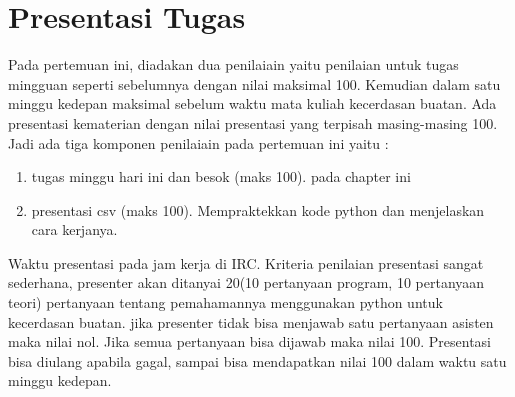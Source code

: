 \section{Presentasi Tugas}
Pada pertemuan ini, diadakan dua penilaiain yaitu penilaian untuk tugas mingguan seperti sebelumnya dengan nilai maksimal 100. Kemudian dalam satu minggu kedepan maksimal sebelum waktu mata kuliah kecerdasan buatan. Ada presentasi kematerian dengan nilai presentasi yang terpisah masing-masing 100. Jadi ada tiga komponen penilaiain pada pertemuan ini yaitu :
\begin{enumerate}
	\item tugas minggu hari ini dan besok (maks 100). pada chapter ini
	\item presentasi csv (maks 100). Mempraktekkan kode python dan menjelaskan cara kerjanya.
\end{enumerate}
Waktu presentasi pada jam kerja di IRC. Kriteria penilaian presentasi sangat sederhana, presenter akan ditanyai 20(10 pertanyaan program, 10 pertanyaan teori) pertanyaan tentang pemahamannya menggunakan python untuk kecerdasan buatan. jika presenter tidak bisa menjawab satu pertanyaan asisten maka nilai nol. Jika semua pertanyaan bisa dijawab maka nilai 100. Presentasi bisa diulang apabila gagal, sampai bisa mendapatkan nilai 100 dalam waktu satu minggu kedepan.

